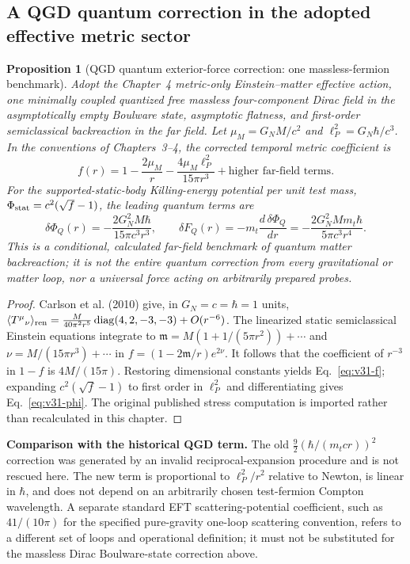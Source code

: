 \documentclass[11pt,a4paper]{article}
\newtheorem{proposition}[theorem]{Proposition}
\theoremstyle{remark}\newtheorem{remark}[theorem]{Remark}
\begin{document}
\subsection{A QGD quantum correction in the adopted effective metric sector}
\begin{proposition}[QGD quantum exterior-force correction: one massless-fermion benchmark]\label{prop:v31-loop}
Adopt the Chapter~4 metric-only Einstein--matter effective action, one
minimally coupled quantized free massless four-component Dirac field in
the asymptotically empty Boulware state, asymptotic flatness, and
first-order semiclassical backreaction in the far field. Let
$\mu_M=G_NM/c^2$ and $\ell_P^2=G_N\hbar/c^3$. In the conventions of
Chapters~3--4, the corrected temporal metric coefficient is
\begin{equation}\label{eq:v31-f}
f(r)=1-\frac{2\mu_M}{r}
-\frac{4\mu_M\ell_P^2}{15\pi r^3}
+\text{higher far-field terms}.
\end{equation}
For the supported-static-body Killing-energy potential per unit test mass,
$\Phi_{\rm stat}=c^2(\sqrt f-1)$, the leading \emph{quantum} terms are
\begin{equation}\label{eq:v31-phi}
\boxed{\delta\Phi_Q(r)=-\frac{2G_N^2 M\hbar}{15\pi c^3 r^3},\qquad
\delta F_Q(r)=-m_t\frac{d\,\delta\Phi_Q}{dr}
=-\frac{2G_N^2Mm_t\hbar}{5\pi c^3 r^4}.}
\end{equation}
This is a \emph{conditional, calculated far-field benchmark} of quantum matter
backreaction; it is not the entire quantum correction from every gravitational
or matter loop, nor a universal force acting on arbitrarily prepared probes.
\end{proposition}
\begin{proof}
Carlson et al. (2010) give, in $G_N=c=\hbar=1$ units,
$\langle T^\mu{}_{\nu}\rangle_{\rm ren}=
\frac{M}{40\pi^2r^5}\operatorname{diag}(4,2,-3,-3)+O(r^{-6})$.
The linearized static semiclassical Einstein equations integrate to
$\mathfrak m=M(1+1/(5\pi r^2))+\cdots$ and
$\nu=M/(15\pi r^3)+\cdots$ in
$f=(1-2\mathfrak m/r)e^{2\nu}$.
It follows that the coefficient of $r^{-3}$ in $1-f$ is
$4M/(15\pi)$. Restoring dimensional constants yields
Eq.~\eqref{eq:v31-f}; expanding $c^2(\sqrt f-1)$ to first order in
$\ell_P^2$ and differentiating gives Eq.~\eqref{eq:v31-phi}.
The original published stress computation is imported rather than
recalculated in this chapter.
\end{proof}
\textbf{Comparison with the historical QGD term.} The old
$\frac92(\hbar/(m_tc r))^2$ correction was generated by an invalid
reciprocal-expansion procedure and is not rescued here. The new term
is proportional to $\ell_P^2/r^2$ relative to Newton, is linear in
$\hbar$, and does not depend on an arbitrarily chosen test-fermion
Compton wavelength. A separate standard EFT scattering-potential
coefficient, such as $41/(10\pi)$ for the specified pure-gravity
one-loop scattering convention, refers to a different set of loops
and operational definition; it must not be substituted for the massless
Dirac Boulware-state correction above.
\end{document}
